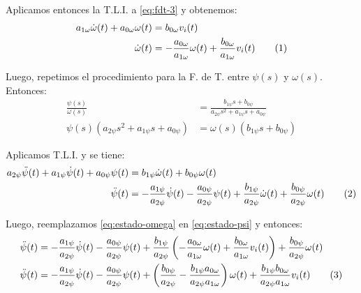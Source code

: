 Aplicamos entonces la T.L.I. a \eqref{eq:fdt-3} y obtenemos:
\begin{align}
  a_{1\omega}\dot\omega (t) + a_{0\omega}\omega (t) &= b_{0\omega}v_{i} (t) \\
  \dot\omega (t) &= -\frac{a_{0\omega}}{a_{1\omega}}\omega (t) + \frac{b_{0\omega}}{a_{1\omega}}v_{i} (t)
  \stepcounter{equation}\tag{\theequation}\label{eq:estado-omega}
\end{align}

Luego, repetimos el procedimiento para la F. de T. entre $\psi (s)$ y $\omega (s)$.
Entonces:
\begin{align}
  \frac{\psi (s)}{\omega (s)} &= \frac{b_{1\psi}s + b_{0\psi}}
    {a_{2\psi}s^{2} + a_{1\psi}s + a_{0\psi}} \\
  \psi (s) \left(a_{2\psi}s^{2} + a_{1\psi}s + a_{0\psi}\right) &=
    \omega (s) \left(b_{1\psi}s + b_{0\psi}\right)
\end{align}

Aplicamos T.L.I. y se tiene:
\begin{align}
  a_{2\psi}\ddot\psi (t) + a_{1\psi}\dot\psi (t) + a_{0\psi}\psi (t) &=
    b_{1\psi}\dot\omega (t) + b_{0\psi}\omega (t) \\
  \ddot\psi (t) &= -\frac{a_{1\psi}}{a_{2\psi}}\dot\psi (t) -
    \frac{a_{0\psi}}{a_{2\psi}}\psi (t) + \frac{b_{1\psi}}{a_{2\psi}}\dot\omega (t) +
    \frac{b_{0\psi}}{a_{2\psi}}\omega (t)
  \stepcounter{equation}\tag{\theequation}\label{eq:estado-psi}
\end{align}

Luego, reemplazamos \eqref{eq:estado-omega} en \eqref{eq:estado-psi} y entonces:
\begin{align}
  \ddot\psi (t) &= -\frac{a_{1\psi}}{a_{2\psi}}\dot\psi (t) -
    \frac{a_{0\psi}}{a_{2\psi}}\psi (t) +
    \frac{b_{1\psi}}{a_{2\psi}}\left(-\frac{a_{0\omega}}{a_{1\omega}}\omega (t) + \frac{b_{0\omega}}{a_{1\omega}}v_{i} (t)\right) +
    \frac{b_{0\psi}}{a_{2\psi}}\omega (t) \\
  \ddot\psi (t) &= -\frac{a_{1\psi}}{a_{2\psi}}\dot\psi (t) -
    \frac{a_{0\psi}}{a_{2\psi}}\psi (t) +
    \left(\frac{b_{0\psi}}{a_{2\psi}} - \frac{b_{1\psi}a_{0\omega}}{a_{2\psi}a_{1\omega}}\right) \omega (t) +
    \frac{b_{1\psi}b_{0\omega}}{a_{2\psi}a_{1\omega}} v_{i} (t)
  \stepcounter{equation}\tag{\theequation}\label{eq:estado-psi-2}
\end{align}

